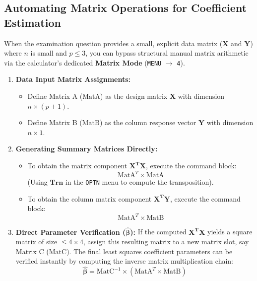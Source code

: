 \documentclass{article}
\begin{document}
\subsection{Automating Matrix Operations for Coefficient Estimation}
When the examination question provides a small, explicit data matrix ($\mathbf{X}$ and $\mathbf{Y}$) where $n$ is small and $p \le 3$, you can bypass structural manual matrix arithmetic via the calculator's dedicated \textbf{Matrix Mode} (\texttt{MENU} $\rightarrow$ \texttt{4}).
\begin{enumerate}
    \item \textbf{Data Input Matrix Assignments:}
    \begin{itemize}
        \item Define Matrix A ($\text{MatA}$) as the design matrix $\mathbf{X}$ with dimension $n \times (p+1)$.
        \item Define Matrix B ($\text{MatB}$) as the column response vector $\mathbf{Y}$ with dimension $n \times 1$.
    \end{itemize}
    \item \textbf{Generating Summary Matrices Directly:}
    \begin{itemize}
        \item To obtain the matrix component $\mathbf{X^TX}$, execute the command block:
        $$\text{MatA}^T \times \text{MatA}$$
        (Using $\mathbf{\text{Trn}}$ in the \texttt{OPTN} menu to compute the transposition).
        \item To obtain the column matrix component $\mathbf{X^TY}$, execute the command block:
        $$\text{MatA}^T \times \text{MatB}$$
    \end{itemize}
    \item \textbf{Direct Parameter Verification ($\hat{\boldsymbol{\beta}}$):}
    If the computed $\mathbf{X^TX}$ yields a square matrix of size $\le 4 \times 4$, assign this resulting matrix to a new matrix slot, say Matrix C ($\text{MatC}$). The final least squares coefficient parameters can be verified instantly by computing the inverse matrix multiplication chain:
    $$\mathbf{\hat{\beta}} = \text{MatC}^{-1} \times (\text{MatA}^T \times \text{MatB})$$
\end{enumerate}
\end{document}
